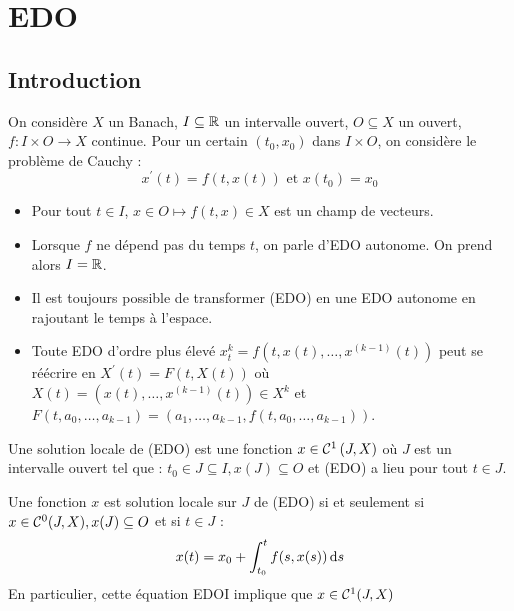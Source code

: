 \documentclass{cours}
\begin{document}
\section{EDO}
\subsection*{Introduction}
\begin{definition}
    On considère $X$ un Banach, $I \subseteq \mathbb{R}$ un intervalle ouvert, $O\subseteq X$ un ouvert, $f : I\times O\rightarrow X$ continue. Pour un certain $(t_{0}, x_{0})$ dans $I \times O$, on considère le problème de Cauchy :
    \begin{equation}
        x^{'}(t) = f(t, x(t)) \text{ et } x(t_{0}) = x_{0}
    \end{equation}
\end{definition}

\begin{definition}
    \begin{itemize}
        \item Pour tout $t \in I$, $x\in O \mapsto f(t, x) \in X$ est un champ de vecteurs.
        \item Lorsque $f$ ne dépend pas du temps $t$, on parle d'EDO autonome. On prend alors $I = \mathbb{R}$.
        \item Il est toujours possible de transformer (EDO) en une EDO autonome en rajoutant le temps à l'espace.
        \item Toute EDO d'ordre plus élevé $x_{t}^{k} = f(t, x(t), \ldots, x^{\left(k-1\right)}(t))$ peut se réécrire en $X^{'}(t) = F(t, X(t))$ où $X(t) = \left(x(t), \ldots, x^{(k-1)}(t)\right)\in X^{k}$ et $F(t, a_{0}, \ldots, a_{k-1}) = (a_{1}, \ldots, a_{k-1}, f(t, a_{0}, \ldots, a_{k-1}))$.
    \end{itemize}
\end{definition}

\begin{definition}
    Une solution locale de (EDO) est une fonction $x \in \mathcal{C}^{1}\left(J, X\right)$ où $J$ est un intervalle ouvert tel que : $t_{0}\in J \subseteq I, x(J) \subseteq O$ et (EDO) a lieu pour tout $t \in J$.
\end{definition}

\begin{lemma}
    Une fonction $x$ est solution locale sur $J$ de (EDO) si et seulement si $x \in \mathcal{C}^{0}(J, X), x(J) \subseteq O$ et si $t \in J$ :
    \begin{equation}
        x(t) = x_{0} + \int_{t_{0}}^{t} f(s, x(s)) {\rm \, d} s
    \end{equation}
    En particulier, cette équation EDOI implique que $x \in \mathcal{C}^{1}(J, X)$
\end{lemma}
\end{document}
